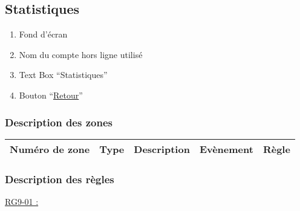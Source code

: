 \documentclass{report}
\begin{document}
\newpage

	\subsection{Statistiques}
	
		
		
		\hypertarget{Statistiques}{}
		\label{Statistiques}
		
		\begin{enumerate}
		  \item Fond d'écran
		  \item Nom du compte hors ligne utilisé
		  \item Text Box ``Statistiques''
		  \item Bouton ``\hyperlink{Accueil}{Retour}''
		\end{enumerate}

		\subsubsection{Description des zones}
		
			\begin{tabular}{|c|c|c|c|c|} \hline
				Numéro de zone & Type  & Description & Evènement &	Règle \\\hline
			\end{tabular}
			
		\subsubsection{Description des règles}

			\underline{RG9-01 :}
				\begin{quote}
				
				\end{quote}
	
\newpage
	
\end{document}
